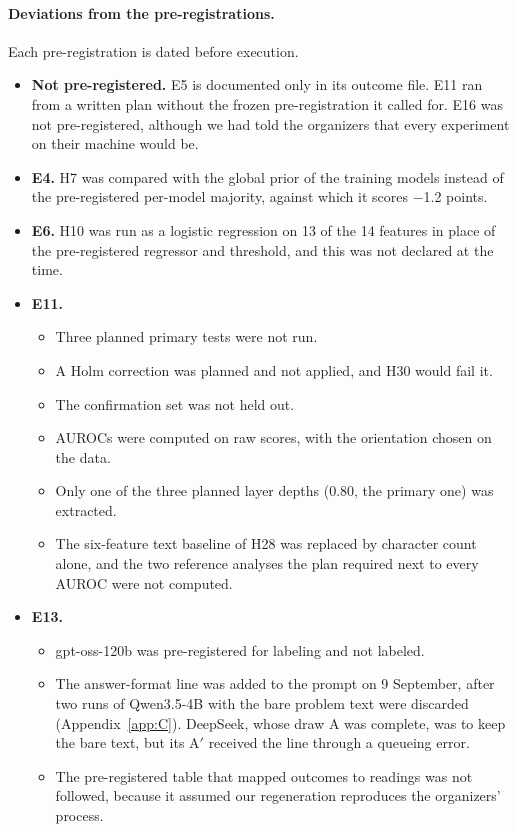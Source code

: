 \paragraph{Deviations from the pre-registrations.} Each pre-registration is dated before execution.
\begin{itemize}
\item \textbf{Not pre-registered.} E5 is documented only in its outcome file. E11 ran from a written plan without the frozen pre-registration it called for. E16 was not pre-registered, although we had told the organizers that every experiment on their machine would be.
\item \textbf{E4.} H7 was compared with the global prior of the training models instead of the pre-registered per-model majority, against which it scores $-$1.2 points.
\item \textbf{E6.} H10 was run as a logistic regression on 13 of the 14 features in place of the pre-registered regressor and threshold, and this was not declared at the time.
\item \textbf{E11.}
  \begin{itemize}
  \item Three planned primary tests were not run.
  \item A Holm correction was planned and not applied, and H30 would fail it.
  \item The confirmation set was not held out.
  \item AUROCs were computed on raw scores, with the orientation chosen on the data.
  \item Only one of the three planned layer depths (0.80, the primary one) was extracted.
  \item The six-feature text baseline of H28 was replaced by character count alone, and the two reference analyses the plan required next to every AUROC were not computed.
  \end{itemize}
\item \textbf{E13.}
  \begin{itemize}
  \item gpt-oss-120b was pre-registered for labeling and not labeled.
  \item The answer-format line was added to the prompt on 9 September, after two runs of Qwen3.5-4B with the bare problem text were discarded (Appendix~\ref{app:C}). DeepSeek, whose draw A was complete, was to keep the bare text, but its A$'$ received the line through a queueing error.
  \item The pre-registered table that mapped outcomes to readings was not followed, because it assumed our regeneration reproduces the organizers' process.

\end{itemize}
\end{itemize}
